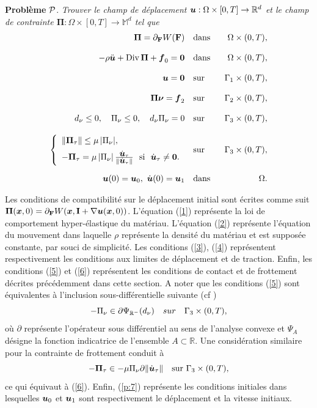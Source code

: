 \medskip\noindent
{\bf Problème} ${\cal P}$. {\it Trouver le champ de déplacement
$\mbox{\boldmath{$u$}}:\Omega\times [0,T]\to\mathbb{R}^d$ et le champ de contrainte
$\boldsymbol{\Pi}:\Omega\times [0,T]\to\mathbb{M}^d$ tel que}
\begin{eqnarray}
\label{1} \boldsymbol{\Pi}=\partial_{\bf F} W({\bf F})\quad&{\rm dans}\
&\Omega\times(0,T),\\[3mm]
\label{2} -\rho\ddot{\bu} + {\rm Div}\,\boldsymbol{\Pi}+\fb_0=\bzero\quad&{\rm
dans}\ &\Omega\times(0,T),\\[3mm]
\label{3} \bu=\bzero\quad &{\rm sur}\ &\Gamma_1\times(0,T),\\[3mm]
\label{4} \boldsymbol{\Pi}\bnu=\fb_2\quad&{\rm sur}\
&\Gamma_2\times(0,T),\\[3mm]
\label{5} d_{\nu}\le 0,\quad
\Pi_\nu\le 0,\quad d_{\nu}\Pi_\nu=0\quad
&{\rm sur}&\ \Gamma_3\times(0,T), \\[3mm]
\label{6}
\left\{\begin{array}{ll}
\|\bPi_\tau\|\le\mu\,|\Pi_\nu|,\\[2mm]
-\bPi_\tau=\mu\,|\Pi_\nu|\,\frac{{\dot\bu}_\tau}{\|{\dot\bu}_\tau\|}
\ \ {\rm si}\ \ \dot{\bu}_\tau\ne\bzero.
\end{array}\right. \quad
&\mbox{sur}&\ \Gamma_3\times(0,T), \\[2mm]
\bu(0)=\bu_0,\ \dot{\bu}(0)=\bu_1 \quad &{\rm dans}&\ \Omega.
\label{p:7}
\end{eqnarray}

Les conditions de compatibilité sur le déplacement initial sont écrites comme suit $\boldsymbol{\Pi}(\mbox{\boldmath{$x$}},0)=\partial_{\bf F} W(\mbox{\boldmath{$x$}},{\bf I} + \nabla {\mbox{\boldmath{$u$}}}(\mbox{\boldmath{$x$}},0))$. L'équation (\ref{1}) représente la loi de comportement hyper-élastique du matériau. L'équation (\ref{2}) représente l'équation du mouvement dans laquelle $\rho $ représente la densité du matériau et est supposée constante, par souci de simplicité. Les conditions (\ref{3}), (\ref{4}) représentent respectivement les conditions aux limites de déplacement et de traction.
Enfin, les conditions (\ref{5}) et (\ref{6}) représentent les conditions de contact et de frottement décrites précédemment dans cette section. A noter que les conditions (\ref{5}) sont équivalentes à l'inclusion sous-différentielle suivante (cf \cite{moreau1977application})
\begin{equation}\label{10n}
-\Pi_{\nu} \in \partial \Psi_{\mathbb{R}^-}(d_{\nu})\quad sur \quad \Gamma_3\times(0,T),
\end{equation}
où $\partial$ représente l'opérateur sous différentiel au sens de l'analyse convexe et $\Psi_A$ désigne la fonction indicatrice de l'ensemble $A \subset \mathbb{R}$.
Une considération similaire pour la contrainte de frottement conduit à
\begin{equation}\label{incluCoul0}
-\mbox{\boldmath{$\Pi$}}_{\tau}\in -\mu\Pi_{\nu}\partial\|{\dot{\mbox{\boldmath{$u$}}}}_{\tau}\|
\quad{\rm sur}\ \Gamma_3\times(0,T),
\end{equation}
ce qui équivaut à (\ref{6}). Enfin, (\ref{p:7}) représente les conditions initiales dans lesquelles $\mbox{\boldmath{$u$}}_0$ et $\mbox{\boldmath{$u$}}_1$ sont respectivement le déplacement et la vitesse initiaux.


